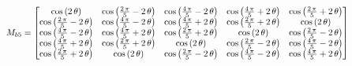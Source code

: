 

\begin{equation*}
    \resizebox{0.9\textwidth}{!}{$
        M_{b5}=
        \begin{bmatrix}
         \cos\left(2\,\theta \right) & \cos\left(\frac{2\,\pi}{5}-2\,\theta \right) & \cos\left(\frac{4\,\pi}{5}-2\,\theta \right) & \cos\left(\frac{4\,\pi}{5}+2\,\theta \right) & \cos\left(\frac{2\,\pi}{5}+2\,\theta \right)\\ \cos\left(\frac{2\,\pi}{5}-2\,\theta \right) & \cos\left(\frac{4\,\pi}{5}-2\,\theta \right) & \cos\left(\frac{4\,\pi}{5}+2\,\theta \right) & \cos\left(\frac{2\,\pi}{5}+2\,\theta \right) & \cos\left(2\,\theta \right)\\ \cos\left(\frac{4\,\pi}{5}-2\,\theta \right) & \cos\left(\frac{4\,\pi}{5}+2\,\theta \right) & \cos\left(\frac{2\,\pi}{5}+2\,\theta \right) & \cos\left(2\,\theta \right) & \cos\left(\frac{2\,\pi}{5}-2\,\theta \right)\\ \cos\left(\frac{4\,\pi}{5}+2\,\theta \right) & \cos\left(\frac{2\,\pi}{5}+2\,\theta \right) & \cos\left(2\,\theta \right) & \cos\left(\frac{2\,\pi}{5}-2\,\theta \right) & \cos\left(\frac{4\,\pi}{5}-2\,\theta \right)\\ \cos\left(\frac{2\,\pi}{5}+2\,\theta \right) & \cos\left(2\,\theta \right) & \cos\left(\frac{2\,\pi}{5}-2\,\theta \right) & \cos\left(\frac{4\,\pi}{5}-2\,\theta \right) & \cos\left(\frac{4\,\pi}{5}+2\,\theta \right) 
        \end{bmatrix}
        $}
\end{equation*} 
